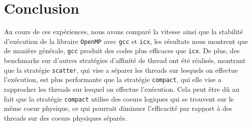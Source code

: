 \documentclass{rapport}
\begin{document}
\section{Conclusion}
Au cours de ces expériences, nous avons comparé la vitesse ainsi que la stabilité d'exécution de la libraire \texttt{OpenMP} avec \texttt{gcc} et \texttt{icx}, les résultats nous montrent que de manière générale, \texttt{gcc} produit des codes plus efficaces que \texttt{icx}. \newline De plus, des benchmarks sur d'autres stratégies d'affinité de thread ont été réalisés, montrant que la stratégie \texttt{scatter}, qui vise a séparer les threads sur lesquels on effectue l'exécution, est plus performante que la stratégie \texttt{compact}, qui elle vise a rapprocher les threads sur lesquel on effectue l'exécution. Cela peut être dû au fait que la stratégie \texttt{compact} utilise des coeurs logiques qui se trouvent sur le même coeur physique, ce qui pourrait diminuer l'efficacité par rapport à des threads sur des coeurs physiques séparés.
\end{document}

